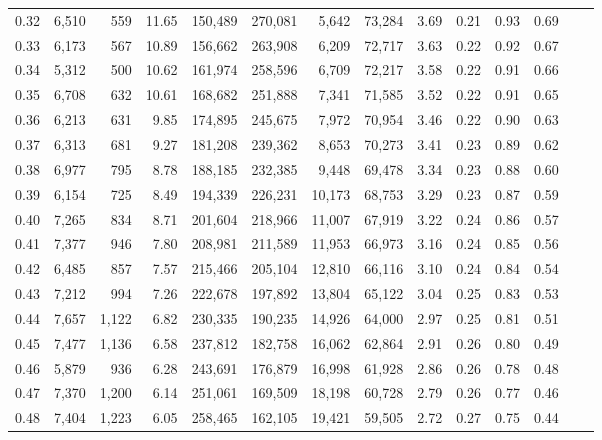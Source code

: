 \begin{tabular}{rrrrrrrrrrrrrr}
0.32 &   6,510 &    559 &   11.65 &  150,489 &  270,081 &   5,642 &  73,284 &  3.69 &  0.21 &  0.93 &      0.69 \\
0.33 &   6,173 &    567 &   10.89 &  156,662 &  263,908 &   6,209 &  72,717 &  3.63 &  0.22 &  0.92 &      0.67 \\
0.34 &   5,312 &    500 &   10.62 &  161,974 &  258,596 &   6,709 &  72,217 &  3.58 &  0.22 &  0.91 &      0.66 \\
0.35 &   6,708 &    632 &   10.61 &  168,682 &  251,888 &   7,341 &  71,585 &  3.52 &  0.22 &  0.91 &      0.65 \\
0.36 &   6,213 &    631 &    9.85 &  174,895 &  245,675 &   7,972 &  70,954 &  3.46 &  0.22 &  0.90 &      0.63 \\
0.37 &   6,313 &    681 &    9.27 &  181,208 &  239,362 &   8,653 &  70,273 &  3.41 &  0.23 &  0.89 &      0.62 \\
0.38 &   6,977 &    795 &    8.78 &  188,185 &  232,385 &   9,448 &  69,478 &  3.34 &  0.23 &  0.88 &      0.60 \\
0.39 &   6,154 &    725 &    8.49 &  194,339 &  226,231 &  10,173 &  68,753 &  3.29 &  0.23 &  0.87 &      0.59 \\
0.40 &   7,265 &    834 &    8.71 &  201,604 &  218,966 &  11,007 &  67,919 &  3.22 &  0.24 &  0.86 &      0.57 \\
0.41 &   7,377 &    946 &    7.80 &  208,981 &  211,589 &  11,953 &  66,973 &  3.16 &  0.24 &  0.85 &      0.56 \\
0.42 &   6,485 &    857 &    7.57 &  215,466 &  205,104 &  12,810 &  66,116 &  3.10 &  0.24 &  0.84 &      0.54 \\
0.43 &   7,212 &    994 &    7.26 &  222,678 &  197,892 &  13,804 &  65,122 &  3.04 &  0.25 &  0.83 &      0.53 \\
0.44 &   7,657 &  1,122 &    6.82 &  230,335 &  190,235 &  14,926 &  64,000 &  2.97 &  0.25 &  0.81 &      0.51 \\
0.45 &   7,477 &  1,136 &    6.58 &  237,812 &  182,758 &  16,062 &  62,864 &  2.91 &  0.26 &  0.80 &      0.49 \\
0.46 &   5,879 &    936 &    6.28 &  243,691 &  176,879 &  16,998 &  61,928 &  2.86 &  0.26 &  0.78 &      0.48 \\
0.47 &   7,370 &  1,200 &    6.14 &  251,061 &  169,509 &  18,198 &  60,728 &  2.79 &  0.26 &  0.77 &      0.46 \\
0.48 &   7,404 &  1,223 &    6.05 &  258,465 &  162,105 &  19,421 &  59,505 &  2.72 &  0.27 &  0.75 &      0.44 \\

\end{tabular}
